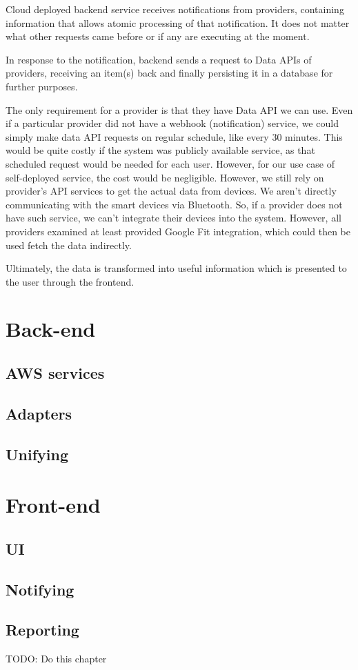 Cloud deployed backend service receives notifications from providers, containing information that allows atomic processing of that notification. It does not matter what other requests came before or if any are executing at the moment. 

In response to the notification, backend sends a request to Data APIs of providers, receiving an item(s) back and finally persisting it in a database for further purposes. 

The only requirement for a provider is that they have Data API we can use. Even if a particular provider did not have a webhook (notification) service, we could simply  make data API requests on regular schedule, like every 30 minutes. This would be quite costly if the system was publicly available service, as that scheduled request would be needed for each user. However, for our use case of self-deployed service, the cost would be negligible. However, we still rely on provider's API services to get the actual data from devices. We aren't directly communicating with the smart devices via Bluetooth. So, if a provider does not have such service, we can't integrate their devices into the system. However, all providers examined at least provided Google Fit integration, which could then be used fetch the data indirectly. 

Ultimately, the data is transformed into useful information which is presented to the user through the frontend.

\section{Back-end}
\subsection{AWS services}
\subsection{Adapters}
\subsection{Unifying}
\section{Front-end}
\subsection{UI}
\subsection{Notifying}
\subsection{Reporting}

TODO: Do this chapter

